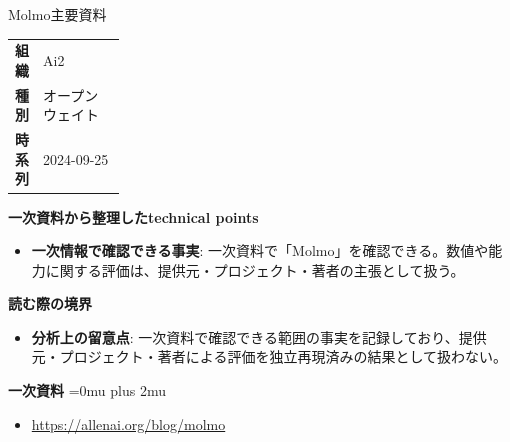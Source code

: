 \begin{technicalnote}{Molmo}{主要資料}
\begingroup
\begin{tabularx}{\linewidth}{@{}>{\bfseries}p{0.22\linewidth}X@{}}
組織 & Ai2 \\
種別 & オープンウェイト \\
時系列 & 2024-09-25 \\
\end{tabularx}
\smallskip
{\bfseries 一次資料から整理したtechnical points}
\begin{itemize}[leftmargin=1.5em,itemsep=0.35em]
\item \textbf{一次情報で確認できる事実}: 一次資料で「Molmo」を確認できる。数値や能力に関する評価は、提供元・プロジェクト・著者の主張として扱う。
\end{itemize}
\begin{minipage}{\linewidth}
{\bfseries 読む際の境界}
\begin{itemize}[leftmargin=1.5em,itemsep=0.35em]
\item \textbf{分析上の留意点}: 一次資料で確認できる範囲の事実を記録しており、提供元・プロジェクト・著者による評価を独立再現済みの結果として扱わない。
\end{itemize}
\begin{samepage}
{\bfseries 一次資料}
\begingroup\sloppy
\Urlmuskip=0mu plus 2mu\relax
\begin{itemize}[leftmargin=1.5em,itemsep=0.25em]
\item {\scriptsize\url{https://allenai.org/blog/molmo}}
\end{itemize}
\endgroup
\end{samepage}
\end{minipage}
\endgroup
\end{technicalnote}
\medskip

